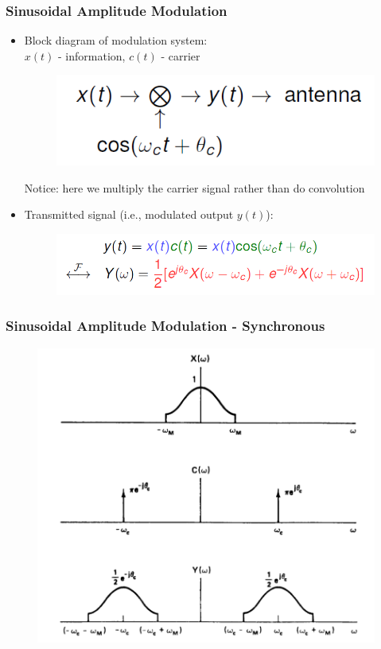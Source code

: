 \documentclass{beamer}
\begin{document}
\begin{frame}
\frametitle{Sinusoidal Amplitude Modulation}
\begin{itemize}
\item Block diagram of modulation system: \\
$x(t)$ - information, $c(t)$ - carrier
\begin{figure}
\includegraphics[width=0.5\linewidth]{AM2}
\end{figure}
Notice: here we multiply the carrier signal rather than do convolution
\item Transmitted signal (i.e., modulated output $y(t)$):
\begin{figure}
\includegraphics[width=0.7\linewidth]{AM3}
\end{figure}
\end{itemize}
\end{frame}

\begin{frame}
\frametitle{Sinusoidal Amplitude Modulation - Synchronous}
\begin{figure}
\includegraphics[width=0.7\linewidth]{AM4}
\end{figure}
\end{frame}
\end{document}

